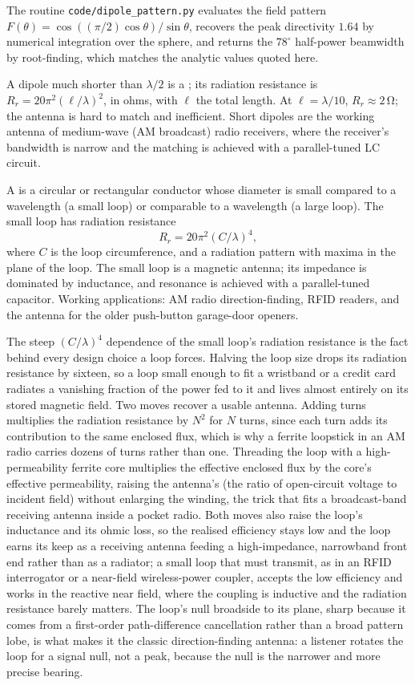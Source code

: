 The routine \texttt{code/dipole\_pattern.py} evaluates the field
pattern $F(\theta) = \cos((\pi/2)\cos\theta)/\sin\theta$, recovers the
peak directivity $1.64$ by numerical integration over the sphere, and
returns the $78^{\circ}$ half-power beamwidth by root-finding, which
matches the analytic values quoted here.

A dipole much shorter than $\lambda/2$ is a ;
its radiation resistance is $R_{r} = 20\pi^{2}(\ell/\lambda)^{2}$, in
ohms, with $\ell$ the total length. At $\ell = \lambda/10$, $R_{r}
\approx 2\,\si{\ohm}$; the antenna is hard to match and inefficient.
Short dipoles are the working antenna of medium-wave (AM broadcast)
radio receivers, where the receiver's bandwidth is narrow and the
matching is achieved with a parallel-tuned LC circuit.

A  is a circular or rectangular conductor whose
diameter is small compared to a wavelength (a small loop) or
comparable to a wavelength (a large loop). The small loop has
radiation resistance
\[
R_{r} = 20\pi^{2}(C/\lambda)^{4},
\]
where $C$ is the loop circumference, and a radiation pattern with
maxima in the plane of the loop. The small loop is a magnetic
antenna; its impedance is dominated by inductance, and resonance is
achieved with a parallel-tuned capacitor. Working applications: AM
radio direction-finding, RFID readers, and the antenna for the older
push-button garage-door openers.

The steep $(C/\lambda)^4$ dependence of the small loop's radiation
resistance is the fact behind every design choice a loop forces. Halving
the loop size drops its radiation resistance by sixteen, so a loop small
enough to fit a wristband or a credit card radiates a vanishing fraction
of the power fed to it and lives almost entirely on its stored magnetic
field. Two moves recover a usable antenna. Adding turns multiplies the
radiation resistance by $N^2$ for $N$ turns, since each turn adds its
contribution to the same enclosed flux, which is why a ferrite loopstick
in an AM radio carries dozens of turns rather than one. Threading the loop
with a high-permeability ferrite core multiplies the effective enclosed
flux by the core's effective permeability, raising the antenna's
 (the ratio of open-circuit voltage to incident
field) without enlarging the winding, the trick that fits a broadcast-band
receiving antenna inside a pocket radio. Both moves also raise the loop's
inductance and its ohmic loss, so the realised efficiency stays low and
the loop earns its keep as a receiving antenna feeding a high-impedance,
narrowband front end rather than as a radiator; a small loop that must
transmit, as in an RFID interrogator or a near-field wireless-power
coupler, accepts the low efficiency and works in the reactive near field,
where the coupling is inductive and the radiation resistance barely
matters. The loop's null broadside to its plane, sharp because it comes
from a first-order path-difference cancellation rather than a broad
pattern lobe, is what makes it the classic direction-finding antenna: a
listener rotates the loop for a signal null, not a peak, because the null
is the narrower and more precise bearing.

